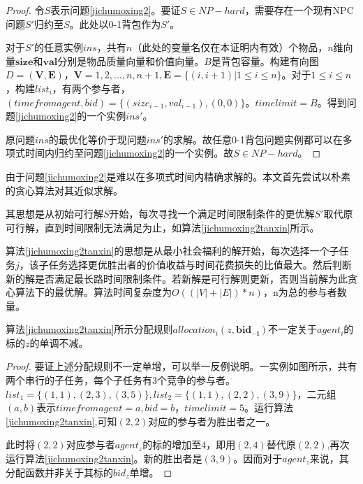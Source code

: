 \documentclass[promaster]{thesis-uestc}
\begin{document}
\begin{proof}
    令$S$表示问题\ref{jichumoxing2}。要证$S\in NP-hard$，需要存在一个现有NPC问题$S'$归约至$S$。此处以0-1背包作为$S'$。

    对于$S'$的任意实例$ins$，共有$n$（此处的变量名仅在本证明内有效）个物品，$n$维向量$\mathbf{size}$和$\mathbf{val}$分别是物品质量向量和价值向量。$B$是背包容量。构建有向图$D=(\mathbf{V},\mathbf{E})$，$\mathbf{V} = {1,2,...,n,n+1},\mathbf{E} = \{(i,i+1)|1 \leq i \leq n\}$。对于$1 \leq i \leq n$，构建$list_i$，有两个参与者，$(timefromagent,bid) = \{(size_{i-1},val_{i-1}),(0,0)\}$。$timelimit = B$。得到问题\ref{jichumoxing2}的一个实例$ins'$。

    原问题$ins$的最优化等价于现问题$ins'$的求解。故任意0-1背包问题实例都可以在多项式时间内归约至问题\ref{jichumoxing2}的一个实例。故$S\in NP-hard$。
\end{proof}

由于问题\ref{jichumoxing2}是难以在多项式时间内精确求解的。本文首先尝试以朴素的贪心算法对其近似求解。

其思想是从初始可行解$S$开始，每次寻找一个满足时间限制条件的更优解$S'$取代原可行解，直到时间限制无法满足为止，如算法\ref{jichumoxing2tanxin}所示。

算法\ref{jichumoxing2tanxin}的思想是从最小社会福利的解开始，每次选择一个子任务$j$，该子任务选择更优胜出者的价值收益与时间花费损失的比值最大。然后判断新的解是否满足最长路时间限制条件。若新解是可行解则更新，否则当前解为此贪心算法下的最优解。算法时间复杂度为$O((|V|+|E|)*n)$，n为总的参与者数量。

\begin{theorem}
    算法\ref{jichumoxing2tanxin}所示分配规则$allocation_i(z,\mathbf{bid_{-i}})$不一定关于$agent_i$的标的$z$的单调不减。
\end{theorem}

\begin{proof}
    要证上述分配规则不一定单增，可以举一反例说明。一实例如图所示，共有两个串行的子任务，每个子任务有$3$个竞争的参与者。$list_1=\{(1,1),(2,3),(3,5)\},list_2=\{(1,1),(2,2),(3,9)\}$，二元组$(a,b)$表示$timefromagent=a,bid=b$，$timelimit=5$。运行算法\ref{jichumoxing2tanxin},可知$(2,2)$对应的参与者为胜出者之一。

    此时将$(2,2)$对应参与者$agent_z$的标的增加至$4$，即用$(2,4)$替代原$(2,2)$,再次运行算法\ref{jichumoxing2tanxin}。新的胜出者是$(3,9)$。因而对于$agent_z$来说，其分配函数并非关于其标的$bid_z$单增。
\end{proof}
\end{document}
